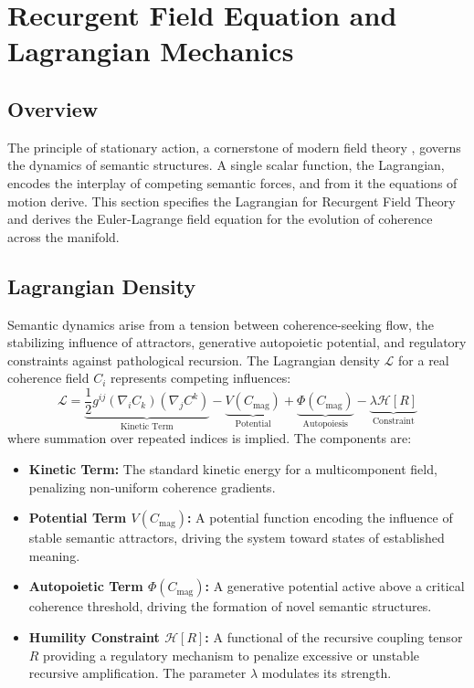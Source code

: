 \chapter{Recurgent Field Equation and Lagrangian Mechanics}

\section{Overview}

The principle of stationary action, a cornerstone of modern field theory \autocite{GoldsteinPooleSafko2002, Arnold1989}, governs the dynamics of semantic structures. A single scalar function, the Lagrangian, encodes the interplay of competing semantic forces, and from it the equations of motion derive. This section specifies the Lagrangian for Recurgent Field Theory and derives the Euler-Lagrange field equation for the evolution of coherence across the manifold.

\section{Lagrangian Density}

Semantic dynamics arise from a tension between coherence-seeking flow, the stabilizing influence of attractors, generative autopoietic potential, and regulatory constraints against pathological recursion. The Lagrangian density \(\mathcal{L}\) for a real coherence field \(C_i\) represents competing influences:
\begin{equation}
\mathcal{L} = \underbrace{\frac{1}{2} g^{ij} (\nabla_i C_k)(\nabla_j C^k)}_{\text{Kinetic Term}} - \underbrace{V(C_{\text{mag}})}_{\text{Potential}} + \underbrace{\Phi(C_{\text{mag}})}_{\text{Autopoiesis}} - \underbrace{\lambda \mathcal{H}[R]}_{\text{Constraint}}
\end{equation}
where summation over repeated indices is implied. The components are:
\begin{itemize}
    \item \textbf{Kinetic Term:} The standard kinetic energy for a multicomponent field, penalizing non-uniform coherence gradients.
    \item \textbf{Potential Term \(V(C_{\text{mag}})\):} A potential function encoding the influence of stable semantic attractors, driving the system toward states of established meaning.
    \item \textbf{Autopoietic Term \(\Phi(C_{\text{mag}})\):} A generative potential active above a critical coherence threshold, driving the formation of novel semantic structures.
    \item \textbf{Humility Constraint \(\mathcal{H}[R]\):} A functional of the recursive coupling tensor \(R\) providing a regulatory mechanism to penalize excessive or unstable recursive amplification. The parameter \(\lambda\) modulates its strength.
\end{itemize}

